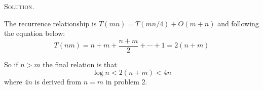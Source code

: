 \documentclass[12pt, a4paper, oneside]{ctexart}
\newenvironment{solution}{\par\noindent\textsc{Solution. }}{\\\par}
\begin{document}
\begin{solution}
\begin{enumerate}
        The recurrence relationship is $T(mn) = T(mn/4) + O(m + n)$ and following the equation below:
        $$
        T(nm) = n + m + \frac{n + m}{2} + \cdots + 1=2(n+m)
        $$
        
        So if $n > m$ the final relation is that
        $$
        \log n < 2(n + m) < 4n
        $$
        where $4n$ is derived from $n=m$ in problem 2.
    \end{enumerate}
\end{solution}
\end{document}
